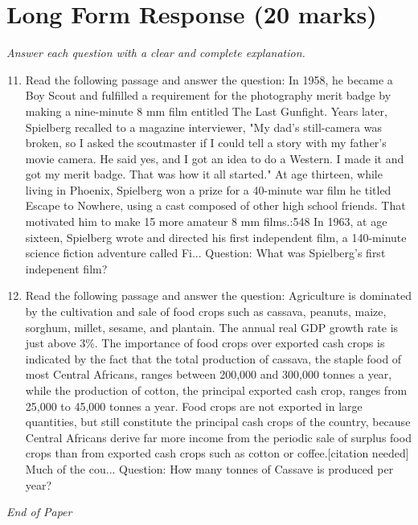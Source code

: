 \documentclass[12pt]{article}
\begin{document}
\section*{Long Form Response (20 marks)}
\textit{Answer each question with a clear and complete explanation.}
\begin{enumerate}[label=\arabic*.]
\setcounter{enumi}{10}
\item Read the following passage and answer the question: In 1958, he became a Boy Scout and fulfilled a requirement for the photography merit badge by making a nine-minute 8 mm film entitled The Last Gunfight. Years later, Spielberg recalled to a magazine interviewer, "My dad's still-camera was broken, so I asked the scoutmaster if I could tell a story with my father's movie camera. He said yes, and I got an idea to do a Western. I made it and got my merit badge. That was how it all started." At age thirteen, while living in Phoenix, Spielberg won a prize for a 40-minute war film he titled Escape to Nowhere, using a cast composed of other high school friends. That motivated him to make 15 more amateur 8 mm films.:548 In 1963, at age sixteen, Spielberg wrote and directed his first independent film, a 140-minute science fiction adventure called Fi... Question: What was Spielberg's first indepenent film?
\item Read the following passage and answer the question: Agriculture is dominated by the cultivation and sale of food crops such as cassava, peanuts, maize, sorghum, millet, sesame, and plantain. The annual real GDP growth rate is just above 3\%. The importance of food crops over exported cash crops is indicated by the fact that the total production of cassava, the staple food of most Central Africans, ranges between 200,000 and 300,000 tonnes a year, while the production of cotton, the principal exported cash crop, ranges from 25,000 to 45,000 tonnes a year. Food crops are not exported in large quantities, but still constitute the principal cash crops of the country, because Central Africans derive far more income from the periodic sale of surplus food crops than from exported cash crops such as cotton or coffee.[citation needed] Much of the cou... Question: How many tonnes of Cassave is produced per year?
\end{enumerate}

\vfill
\noindent\textit{End of Paper}
\end{document}
